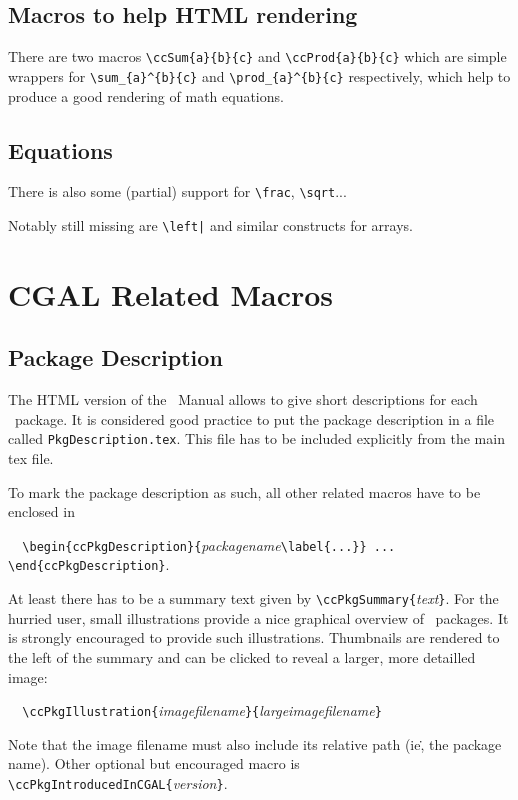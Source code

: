 \documentclass[11pt]{article}
\begin{document}
\subsection{Macros to help HTML rendering}
There are two macros \verb+\ccSum{a}{b}{c}+ and \verb+\ccProd{a}{b}{c}+
which are simple wrappers for \verb+\sum_{a}^{b}{c}+ and \verb+\prod_{a}^{b}{c}+
respectively, which help to produce a good rendering of math equations.

\subsection{Equations}

There is also some (partial) support for \verb+\frac+, \verb+\sqrt+...

Notably still missing are \verb+\left|+ and similar constructs for arrays.


\section{CGAL Related Macros}
\subsection{Package Description}
The HTML version of the \cgal\ Manual allows to give short descriptions for
each \cgal\ package. It is considered good practice to put the package
description in a file called \verb+PkgDescription.tex+. This file has to be
included explicitly from the main tex file.

To mark the package description as such, all other related macros have to be
enclosed in

\verb+  \begin{ccPkgDescription}{+{\em packagename}\verb+\label{...}} ... \end{ccPkgDescription}+.



At least there has to be a summary text given by
\verb+\ccPkgSummary{+{\em text}\verb+}+. For the hurried user, small
illustrations provide a nice graphical overview of
\cgal\ packages. It is strongly encouraged to provide such illustrations.
Thumbnails are rendered to the left of the summary and can be clicked to
reveal a larger, more detailled image:

\verb+  \ccPkgIllustration{+{\em imagefilename}\verb+}{+{\em largeimagefilename}\verb+}+

Note that the image filename must also include its relative path
(ie\., the package name). Other optional but encouraged macro is
\verb+\ccPkgIntroducedInCGAL{+{\em version}\verb+}+.
\end{document}
